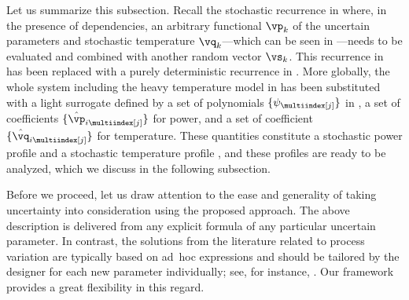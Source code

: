 Let us summarize this subsection. Recall the stochastic recurrence in
 where, in the presence of dependencies, an
arbitrary functional $\vp_k$ of the uncertain parameters \vu and stochastic
temperature $\vq_k$---which can be seen in ---needs to
be evaluated and combined with another random vector $\vs_k$. This recurrence in
 has been replaced with a purely deterministic
recurrence in . More globally, the whole system including
the heavy temperature model in  has been
substituted with a light surrogate defined by a set of polynomials $\{
\psi_{\multiindex[j]} \}$ in \vz, a set of coefficients $\{ \hat{\vp}_{i
\multiindex[j]} \}$ for power, and a set of coefficient $\{ \hat{\vq}_{i
\multiindex[j]} \}$ for temperature. These quantities constitute a stochastic
power profile \mp and a stochastic temperature profile \mq, and these profiles
are ready to be analyzed, which we discuss in the following subsection.

Before we proceed, let us draw attention to the ease and generality of taking
uncertainty into consideration using the proposed approach. The above
description is delivered from any explicit formula of any particular uncertain
parameter. In contrast, the solutions from the literature related to process
variation are typically based on ad~hoc expressions and should be tailored by
the designer for each new parameter individually; see, for instance,
\cite{ghanta2006, bhardwaj2008, huang2009a}. Our framework provides a great
flexibility in this regard.
